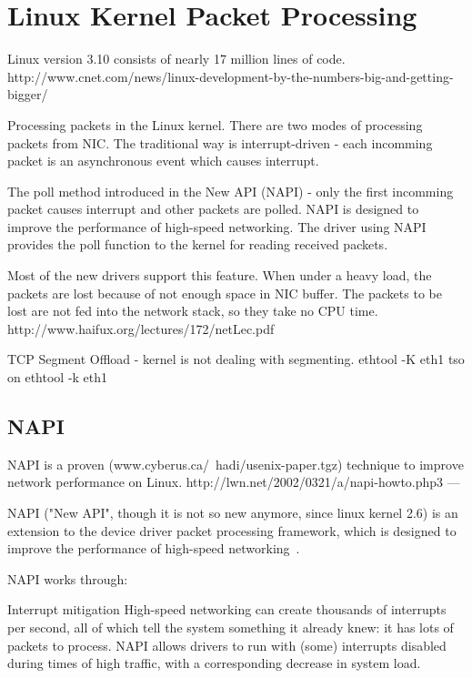 
\chapter{Linux Kernel Packet Processing}

Linux version 3.10 consists of nearly 17 million lines of code.
http://www.cnet.com/news/linux-development-by-the-numbers-big-and-getting-bigger/

Processing packets in the Linux kernel.
There are two modes of processing packets from NIC.
The traditional way is interrupt-driven - each incomming packet is an
asynchronous event which causes interrupt.

The poll method introduced in the New API (NAPI) - only the first incomming packet causes interrupt
and other packets are polled.
NAPI is designed to improve the performance of high-speed networking.
The driver using NAPI provides the poll function to the kernel for reading received packets.

Most of the new drivers support this feature.
When under a heavy load, the packets are lost because of not enough space in NIC buffer.
The packets to be lost are not fed into the network stack, so they take no CPU time.
http://www.haifux.org/lectures/172/netLec.pdf


TCP Segment Offload - kernel is not dealing with segmenting.
ethtool -K eth1 tso on
ethtool -k eth1


\section{NAPI}

NAPI is a proven (www.cyberus.ca/~hadi/usenix-paper.tgz) technique
to improve network performance on Linux.
http://lwn.net/2002/0321/a/napi-howto.php3
---

NAPI ("New API", though it is not so new anymore, since linux kernel 2.6) is an extension to the device driver packet processing framework, which is designed to improve the performance of high-speed networking~\cite{linux-foundation-napi}.

NAPI works through:

Interrupt mitigation 
    High-speed networking can create thousands of interrupts per second, all of which tell the system something it already knew: it has lots of packets to process. NAPI allows drivers to run with (some) interrupts disabled during times of high traffic, with a corresponding decrease in system load.

